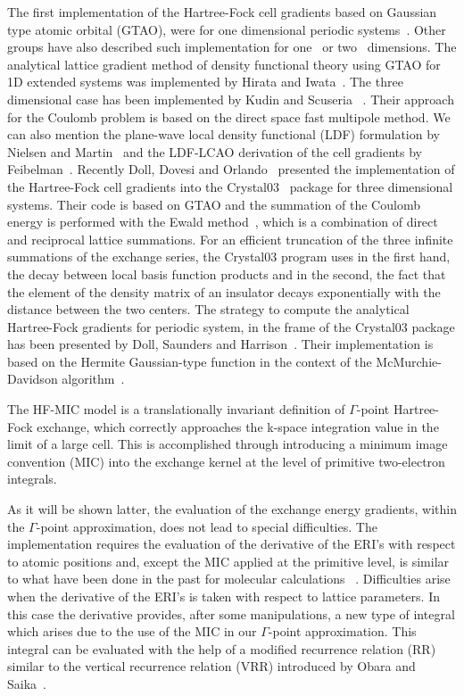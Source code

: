 \documentclass[prl,twocolumn,showpacs,twocolumngrid,superbib]{revtex4}
\begin{document}
The first implementation of the Hartree-Fock cell gradients based on 
Gaussian type atomic orbital (GTAO),
were for one dimensional periodic systems~\cite{HTeramae83,HTeramae84}. 
Other groups have also described such implementation for 
one~\cite{DJacquemin99A,DJacquemin99B} or two~\cite{MTobita03} dimensions. 
The analytical lattice gradient method of density functional theory using GTAO for 
1D extended systems was implemented by Hirata and Iwata~\cite{SHirata98}.
The three dimensional case has been implemented by Kudin and Scuseria 
~\cite{KKudin00A,KKudin00B}. Their approach for the Coulomb problem is 
based on the direct space fast multipole method.
We can also mention the plane-wave local density functional (LDF) formulation
by Nielsen and Martin~\cite{ONielsen85} and the LDF-LCAO derivation of 
the cell gradients by Feibelman~\cite{PFeibelman91}.
Recently Doll, Dovesi and Orlando~\cite{KDoll04} presented 
the implementation of the Hartree-Fock cell gradients into 
the {\sc Crystal03}~\cite{RDovesi00} package for three dimensional systems. 
Their code is based on GTAO and the summation 
of the Coulomb energy is performed with the Ewald method~\cite{PEwald21}, 
which is a combination of direct and reciprocal lattice summations.
For an efficient truncation of the three infinite summations of the exchange
series, the {\sc Crystal03} program uses in the first hand, the decay between local basis function 
products and in the second, the fact that the element of the density 
matrix of an insulator decays exponentially with the distance between 
the two centers.
The strategy to compute the analytical Hartree-Fock gradients for 
periodic system, in the frame of the {\sc Crystal03} package has been 
presented by Doll, Saunders and Harrison~\cite{KDoll01}.
Their implementation is based on the Hermite Gaussian-type function
in the context of the McMurchie-Davidson algorithm~\cite{LMcmurchie78}.


The HF-MIC model is a translationally invariant definition of $\Gamma$-point Hartree-Fock exchange, 
which correctly approaches the k-space integration value in the limit of a
large cell. This is accomplished through introducing a 
minimum image convention (MIC) into the exchange kernel
at the level of primitive two-electron integrals.

As it will be shown latter, the evaluation of the exchange energy gradients,
within the $\Gamma$-point approximation,
does not lead to special difficulties. The implementation requires the evaluation
of the derivative of the ERI's with respect to atomic positions and, 
except the MIC applied at the primitive level, is
similar to what have been done in the past for molecular calculations 
~\cite{SObara86,MGordon88,KIshida91,THelgaker92,KIshida93}.
Difficulties arise when the derivative of the ERI's is taken with respect to lattice 
parameters. In this case the derivative provides, after some manipulations, 
a new type of integral which
arises due to the use of the MIC in our $\Gamma$-point approximation. This integral 
can be evaluated with the help of a modified recurrence relation (RR) similar to the
vertical recurrence relation (VRR) introduced by Obara and Saika~\cite{SObara86}.
\end{document}
